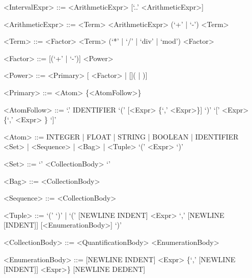 \begin{grammar}
<IntervalExpr> ::= <ArithmeticExpr> [`..' <ArithmeticExpr>]

<ArithmeticExpr> ::= <Term>
    \alt <ArithmeticExpr> (`+' | `-') <Term>

<Term> ::= <Factor>
    \alt <Term> (`*' | `/' | `div' | `mod') <Factor>

<Factor> ::= [(`+' | `-')] <Power>

<Power> ::= <Primary> [\lit{\^{}} <Factor> | [\lit{${}^-$}]( | )]

<Primary> ::= <Atom> \{<AtomFollow>\}

<AtomFollow> ::= `.' IDENTIFIER
    \alt `(' [<Expr> \{`,' <Expr>\}] `)'
    \alt `[' <Expr> \{`,' <Expr> \} `]' %

<Atom> ::= INTEGER | FLOAT | STRING | BOOLEAN | IDENTIFIER
    \alt <Set> | <Sequence> | <Bag> | <Tuple>
    \alt `(' <Expr> `)' %

<Set> ::= `{' <CollectionBody> `}'

<Bag> ::= \lit{$\llbracket$} <CollectionBody> \lit{$\rrbracket$}

<Sequence> ::= \lit{$\langle$} <CollectionBody> \lit{$\rangle$}

<Tuple> ::= `(' `)' | `(' [NEWLINE INDENT] <Expr> `,' [NEWLINE [INDENT]] [<EnumerationBody>] `)'

<CollectionBody> ::= <QuantificationBody>
    \alt <EnumerationBody>

<EnumerationBody> ::= [NEWLINE INDENT] <Expr> \{`,' [NEWLINE [INDENT]] <Expr>\} [NEWLINE DEDENT]


\end{grammar}
